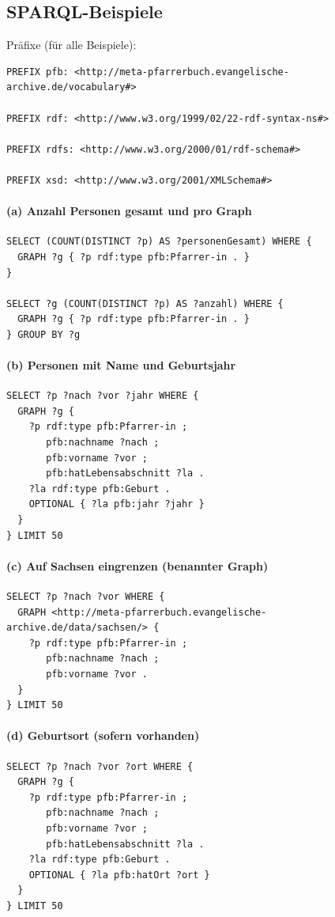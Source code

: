 \subsection{SPARQL-Beispiele}
\noindent Präfixe (für alle Beispiele):
\begin{verbatim}
PREFIX pfb: <http://meta-pfarrerbuch.evangelische-archive.de/vocabulary#>

PREFIX rdf: <http://www.w3.org/1999/02/22-rdf-syntax-ns#>

PREFIX rdfs: <http://www.w3.org/2000/01/rdf-schema#>

PREFIX xsd: <http://www.w3.org/2001/XMLSchema#>

\end{verbatim}

\paragraph{(a) Anzahl Personen gesamt und pro Graph}
\begin{verbatim}
SELECT (COUNT(DISTINCT ?p) AS ?personenGesamt) WHERE {
  GRAPH ?g { ?p rdf:type pfb:Pfarrer-in . }
}

SELECT ?g (COUNT(DISTINCT ?p) AS ?anzahl) WHERE {
  GRAPH ?g { ?p rdf:type pfb:Pfarrer-in . }
} GROUP BY ?g
\end{verbatim}

\paragraph{(b) Personen mit Name und Geburtsjahr}
\begin{verbatim}
SELECT ?p ?nach ?vor ?jahr WHERE {
  GRAPH ?g {
    ?p rdf:type pfb:Pfarrer-in ;
       pfb:nachname ?nach ;
       pfb:vorname ?vor ;
       pfb:hatLebensabschnitt ?la .
    ?la rdf:type pfb:Geburt .
    OPTIONAL { ?la pfb:jahr ?jahr }
  }
} LIMIT 50
\end{verbatim}

\paragraph{(c) Auf Sachsen eingrenzen (benannter Graph)}
\begin{verbatim}
SELECT ?p ?nach ?vor WHERE {
  GRAPH <http://meta-pfarrerbuch.evangelische-archive.de/data/sachsen/> {
    ?p rdf:type pfb:Pfarrer-in ;
       pfb:nachname ?nach ;
       pfb:vorname ?vor .
  }
} LIMIT 50
\end{verbatim}

\paragraph{(d) Geburtsort (sofern vorhanden)}
\begin{verbatim}
SELECT ?p ?nach ?vor ?ort WHERE {
  GRAPH ?g {
    ?p rdf:type pfb:Pfarrer-in ;
       pfb:nachname ?nach ;
       pfb:vorname ?vor ;
       pfb:hatLebensabschnitt ?la .
    ?la rdf:type pfb:Geburt .
    OPTIONAL { ?la pfb:hatOrt ?ort }
  }
} LIMIT 50
\end{verbatim}

